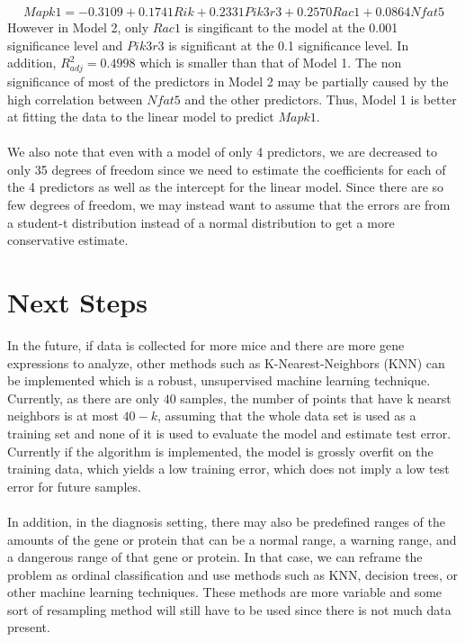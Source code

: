 \documentclass{article}
\begin{document}
\begin{equation}
	Mapk1=-0.3109+0.1741Rik+0.2331Pik3r3+0.2570Rac1+0.0864Nfat5
	\label{eq:Model2}
\end{equation}
However in Model 2, only $Rac1$ is singificant to the model at the 0.001 significance level and $Pik3r3$ is significant at the 0.1 significance level.  In addition, $R^2_{adj} = 0.4998$ which is smaller than that of Model 1.  The non significance of most of the predictors in Model 2 may be partially caused by the high correlation between $Nfat5$ and the other predictors.  Thus, Model 1 is better at fitting the data to the linear model to predict $Mapk1$.\\
\null\\
We also note that even with a model of only 4 predictors, we are decreased to only 35 degrees of freedom since we need to estimate the coefficients for each of the 4 predictors as well as the intercept for the linear model.  Since there are so few degrees of freedom, we may instead want to assume that the errors are from a student-t distribution instead of a normal distribution to get a more conservative estimate.

\section{Next Steps}
In the future, if data is collected for more mice and there are more gene expressions to analyze, other methods such as K-Nearest-Neighbors (KNN) can be implemented which is a robust, unsupervised machine learning technique.  Currently, as there are only $40$ 
samples, the number of points that have k nearst neighbors is at most $40-k$, assuming that the whole data set is used as a training 
set and none of it is used to evaluate the model and estimate test error.  Currently if the algorithm is implemented, the 
model is grossly overfit on the training data, which yields a low training error, which does not imply a low test error for future samples.\\
\null\\
In addition, in the diagnosis setting, there may also be predefined ranges of the amounts of the gene or protein that can be a normal range, a warning range, and a dangerous range of that gene or protein.  In that case, we can reframe the problem as ordinal classification and use methods such as KNN, decision trees, or other machine learning techniques.  These methods are more variable and some sort of resampling method will still have to be used since there is not much data present. 
\end{document}
